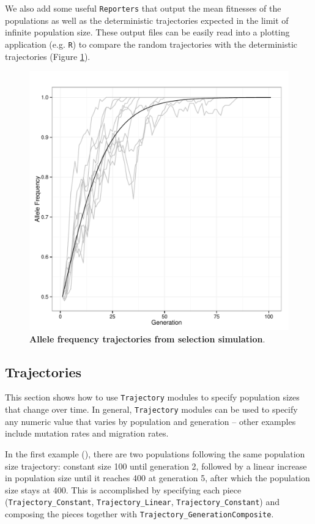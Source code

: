 \documentclass{article}
\begin{document}
We also add some useful \texttt{Reporters} that output the mean fitnesses of the
populations as well as the deterministic trajectories expected in the limit of
infinite population size.  These output files can be easily read into a
plotting application (e.g. \texttt{R}) to compare the random trajectories with
the deterministic trajectories (Figure \ref{figure_allele_frequency_trajectories}).

\begin{figure}[!h]
    \begin{center}
        \includegraphics[width=.60\textwidth]{fig/allele_frequency_trajectories.pdf}
    \end{center}
    \caption{{\bf Allele frequency trajectories from selection simulation}.}
    \label{figure_allele_frequency_trajectories}
\end{figure}


\subsection{Trajectories}

This section shows how to use \texttt{Trajectory} modules to specify population
sizes that change over time.  In general, \texttt{Trajectory} modules can be used
to specify any numeric value that varies by population and generation -- other examples
include mutation rates and migration rates.

\begin{sloppypar}
In the first example (), there are two populations
following the same population size trajectory: constant size 100 until generation 2,
followed by a linear increase in population size until it reaches 400 at generation 5,
after which the population size stays at 400.  This is accomplished by specifying each
piece (\texttt{Trajectory\_Constant}, \texttt{Trajectory\_Linear}, \texttt{Trajectory\_Constant}) 
and composing the pieces together with \texttt{Trajectory\_GenerationComposite}.  
\end{sloppypar}
\end{document}
